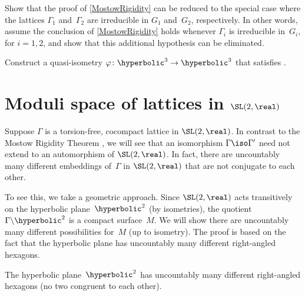 \begin{exercises}

\item \label{MostowRigIrredEnough}
Show that the proof of \cref{MostowRigidity} can be reduced to the special case where the lattices $\Gamma_1$ and~$\Gamma_2$ are irreducible in $G_1$ and~$G_2$, respectively.
In other words, assume the conclusion of \cref{MostowRigidity} holds whenever $\Gamma_i$ is irreducible in~$G_i$, for $i = 1,2$, and show that this additional hypothesis can be eliminated.

\item \label{MostowPfSO13EquiEx}
Construct a quasi-isometry $\varphi \colon \hyperbolic^3 \to \hyperbolic^3$ that satisfies .

\end{exercises}











\section{Moduli space of lattices in \texorpdfstring{$\SL(2,\real)$}{SL(2,R)}} \label{ModuliSpaceSL2}

Suppose $\Gamma$ is a torsion-free, cocompact lattice in $\SL(2,\real)$. In contrast to the Mostow Rigidity Theorem , we will see that an isomorphism $\Gamma \iso \Gamma'$ need not extend to an automorphism of $\SL(2,\real)$. In fact, there are uncountably many different embeddings of~$\Gamma$ in $\SL(2,\real)$ that are not conjugate to each other.

To see this, we take a geometric approach.
Since $\SL(2,\real)$ acts transitively on the hyperbolic plane~$\hyperbolic^2$ (by isometries), the quotient $\Gamma \backslash \hyperbolic^2$ is a compact surface~$M$. We will show there are uncountably many different possibilities for~$M$ (up to isometry). 
The proof is based on the fact that the hyperbolic plane has uncountably many different right-angled hexagons.

\begin{lem} \label{ManyHexagons}
The hyperbolic plane\/~$\hyperbolic^2$ has uncountably many different right-angled hexagons \textup(no two congruent to each other\/\textup).
\end{lem}


